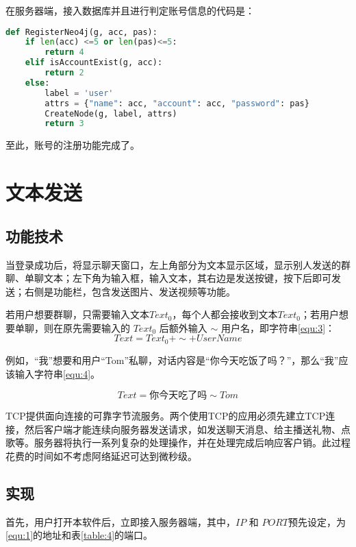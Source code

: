 \documentclass[forprint]{OSPaper}
\begin{document}
在服务器端，接入数据库并且进行判定账号信息的代码是：

\begin{lstlisting}[language=Python]
def RegisterNeo4j(g, acc, pas):
	if len(acc) <=5 or len(pas)<=5:
		return 4
	elif isAccountExist(g, acc):
		return 2
	else:
		label = 'user'
		attrs = {"name": acc, "account": acc, "password": pas}
		CreateNode(g, label, attrs)
		return 3
\end{lstlisting} 

至此，账号的注册功能完成了。

\section{文本发送}

\subsection{功能技术}

当登录成功后，将显示聊天窗口，左上角部分为文本显示区域，显示别人发送的群聊、单聊文本；左下角为输入框，输入文本，其右边是发送按键，按下后即可发送；右侧是功能栏，包含发送图片、发送视频等功能。

若用户想要群聊，只需要输入文本$Text_0$，每个人都会接收到文本$Text_0$；若用户想要单聊，则在原先需要输入的 $Text_0$ 后额外输入 $ \sim $  用户名，即字符串\ref{equ:3}：
\begin{equation}
	\label{equ:3}
	Text = Text_0 + \sim + UserName
\end{equation} 

例如，“我”想要和用户“Tom”私聊，对话内容是“你今天吃饭了吗？”，那么“我”应该输入字符串\ref{equ:4}。

\begin{equation}
	\label{equ:4}
	Text = \mbox{你今天吃了吗} \sim Tom
\end{equation} 

TCP提供面向连接的可靠字节流服务。两个使用TCP的应用必须先建立TCP连接，然后客户端才能连续向服务器发送请求，如发送聊天消息、给主播送礼物、点歌等。服务器将执行一系列复杂的处理操作，并在处理完成后响应客户销。此过程花费的时间如不考虑阿络延迟可达到微秒级。
\subsection{实现}

首先，用户打开本软件后，立即接入服务器端，其中，$IP$ 和 $PORT$预先设定，为\ref{equ:1}的地址和表\ref{table:4}的端口。
\end{document}
